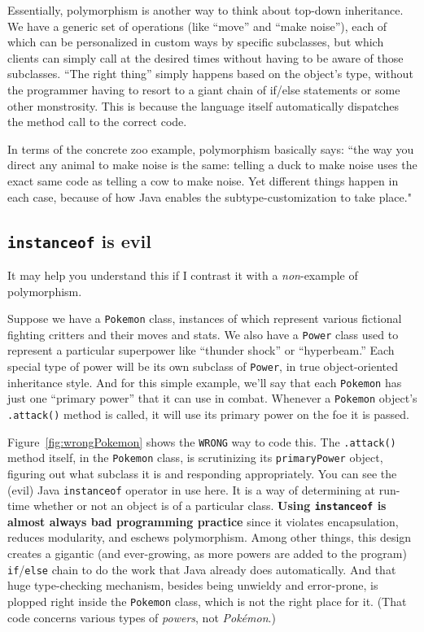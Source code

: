 Essentially, polymorphism is another way to think about top-down inheritance.
We have a generic set of operations (like ``move'' and ``make noise''), each
of which can be personalized in custom ways by specific subclasses, but which
clients can simply call at the desired times without having to be aware of
those subclasses. ``The right thing'' simply happens based on the object's
type, without the programmer having to resort to a giant chain of if/else
statements or some other monstrosity. This is because the language itself
automatically dispatches the method call to the correct code.

In terms of the concrete zoo example, polymorphism basically says: ``the way
you direct any animal to make noise is the same: telling a duck to make noise
uses the exact same code as telling a cow to make noise. Yet different things
happen in each case, because of how Java enables the subtype-customization to
take place."

\subsection{\texttt{instanceof} is evil}

It may help you understand this if I contrast it with a \textit{non}-example
of polymorphism.

Suppose we have a \texttt{Pokemon} class, instances of which represent various
fictional fighting critters and their moves and stats. We also have a
\texttt{Power} class used to represent a particular superpower like ``thunder
shock'' or ``hyperbeam.'' Each special type of power will be its own subclass
of \texttt{Power}, in true object-oriented inheritance style. And for this
simple example, we'll say that each \texttt{Pokemon} has just one ``primary
power'' that it can use in combat. Whenever a \texttt{Pokemon} object's
\texttt{.attack()} method is called, it will use its primary power on the foe
it is passed.

Figure~\ref{fig:wrongPokemon} shows the \texttt{WRONG} way to code this. The
\texttt{.attack()} method itself, in the \texttt{Pokemon} class, is
scrutinizing its \texttt{primaryPower} object, figuring out what subclass it
is and responding appropriately. You can see the (evil) Java
\texttt{instanceof} operator in use here. It is a way of determining at
run-time whether or not an object is of a particular class. \textbf{Using
\texttt{instanceof} is almost always bad programming practice} since it
violates encapsulation, reduces modularity, and eschews polymorphism.
Among other things, this design creates a gigantic (and ever-growing, as more
powers are added to the program) \texttt{if}/\texttt{else} chain to do the
work that Java already does automatically. And that huge type-checking
mechanism, besides being unwieldy and error-prone, is plopped right inside the
\texttt{Pokemon} class, which is not the right place for it. (That code
concerns various types of \textit{powers}, not \textit{Pok\'{e}mon}.)

